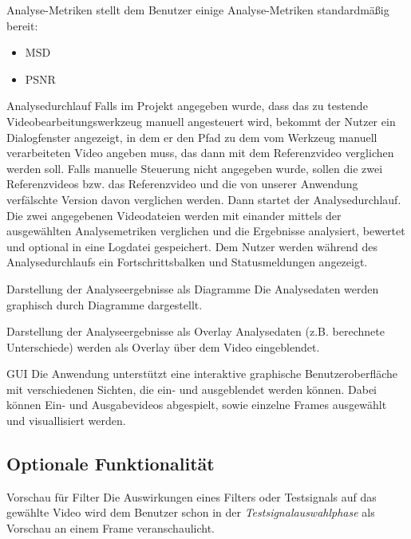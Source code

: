 \newItemPF Analyse-Metriken
\newline
\projektTitel stellt dem Benutzer einige Analyse-Metriken standardmäßig bereit:
\begin{itemize}
\item \gls{MSD}
\item \gls{PSNR}
\end{itemize}


\newItemPF Analysedurchlauf
\newline
Falls im Projekt angegeben wurde, dass das zu testende Videobearbeitungswerkzeug manuell angesteuert wird, 
bekommt der Nutzer ein Dialogfenster angezeigt, in dem er den Pfad zu dem vom Werkzeug manuell verarbeiteten Video angeben muss, das dann mit dem Referenzvideo verglichen werden soll. Falls manuelle Steuerung nicht angegeben wurde, sollen die zwei Referenzvideos bzw. das Referenzvideo und die von unserer Anwendung verfälschte Version davon verglichen werden. Dann startet der Analysedurchlauf. Die zwei angegebenen Videodateien werden mit einander mittels der ausgewählten Analysemetriken verglichen und die Ergebnisse analysiert, bewertet und optional in eine Logdatei gespeichert. Dem Nutzer werden während des Analysedurchlaufs ein Fortschrittsbalken und Statusmeldungen angezeigt. 

\newItemPF Darstellung der Analyseergebnisse als Diagramme
\newline
Die Analysedaten werden graphisch durch Diagramme dargestellt.

\newItemPF Darstellung der Analyseergebnisse als Overlay
\newline
Analysedaten (z.B. berechnete Unterschiede) werden als Overlay über dem Video eingeblendet.


\newItemPF GUI
\newline
Die Anwendung unterstützt eine interaktive graphische Benutzeroberfläche mit verschiedenen Sichten, die ein- und ausgeblendet werden können. Dabei können Ein- und Ausgabevideos abgespielt, sowie einzelne Frames ausgewählt und visuallisiert werden.





\subsection{Optionale Funktionalität}

\newItemPF Vorschau für Filter
\newline
Die Auswirkungen eines Filters oder Testsignals auf das gewählte Video wird dem Benutzer schon in der \emph{Testsignalauswahlphase} als Vorschau an einem Frame veranschaulicht.



